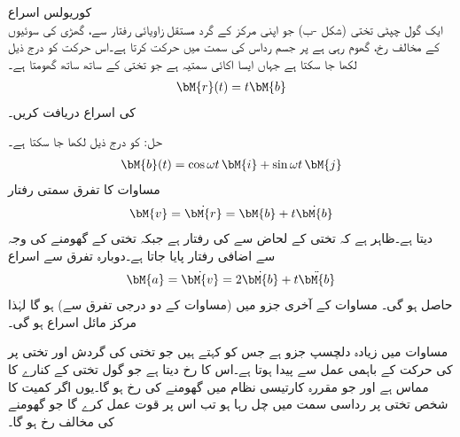 \quad کوریولس اسراع\\ 
ایک گول چپٹی تختی (شکل -ب) جو اپنی مرکز کے گرد مستقل زاویائی رفتار  سے، گھڑی کی سوئیوں کے مخالف رخ، گھوم رہی ہے پر جسم   رداس کی سمت میں حرکت کرتا ہے۔اس حرکت کو درج ذیل لکھا جا سکتا ہے جہاں  ایسا اکائی سمتیہ ہے جو تختی کے ساتھ ساتھ گھومتا ہے۔
\begin{align}\label{مساوات_الاحصاء_مثال_کوریولس_الف}
\bM{r}(t)=t\bM{b}
\end{align}
 کی اسراع دریافت کریں۔

حل: کو درج ذیل لکھا جا سکتا ہے۔
\begin{align}\label{مساوات_الاحصاء_مثال_کوریولس_ب}
\bM{b}(t)=\cos \omega t \,\bM{i}+\sin \omega t \, \bM{j}
\end{align}
مساوات  کا تفرق سمتی رفتار
\begin{align}\label{مساوات_الاحصاء_مثال_کوریولس_پ}
\bM{v}=\dot{\bM{r}}=\bM{b}+t\dot{\bM{b}}
\end{align}
دیتا ہے۔ظاہر ہے کہ تختی کے لحاض سے  کی رفتار  ہے جبکہ تختی کے گھومنے کی وجہ سے اضافی رفتار  پایا جاتا ہے۔دوبارہ تفرق سے اسراع 
\begin{align}\label{مساوات_الاحصاء_مثال_کوریولس_ت}
\bM{a}=\dot{\bM{v}}=2\dot{\bM{b}}+t\ddot{\bM{b}}
\end{align}
حاصل ہو گی۔ مساوات  کے آخری جزو میں (مساوات   کے دو درجی تفرق سے)   ہو گا لہٰذا  مرکز مائل اسراع ہو گی۔

 مساوات  میں زیادہ دلچسپ جزو  ہے جس کو  کہتے ہیں  جو تختی کی گردش اور تختی پر  کی حرکت  کے باہمی عمل سے پیدا ہوتا ہے۔اس کا رخ  دیتا ہے جو گول تختی کے کنارے کا مماس ہے اور جو  مقررہ  کارتیسی نظام میں گھومنے کی رخ ہو گا۔یوں اگر کمیت   کا شخص تختی پر رداسی سمت میں چل رہا ہو تب اس پر قوت  عمل کرے گا جو گھومنے کی مخالف رخ ہو گا۔ 

